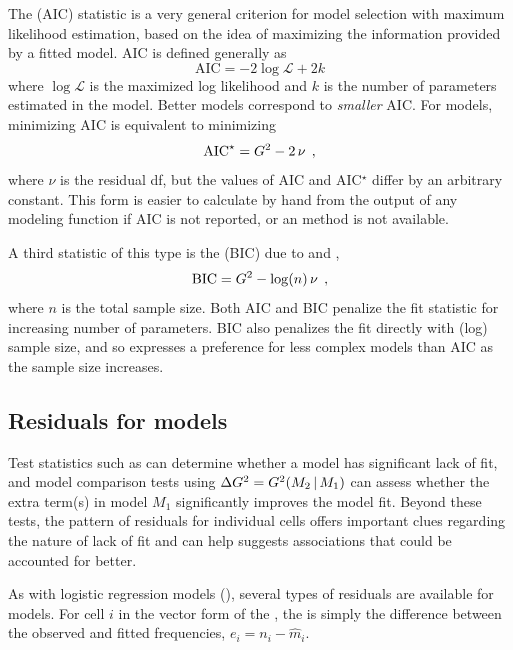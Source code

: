 \documentclass[11pt]{book}\usepackage[]{graphicx}\usepackage[]{color}
\begin{document}
The  (AIC) statistic
\citep{Akaike:73} is a very general criterion for model selection
with maximum likelihood estimation, based on the idea of maximizing
the information provided by a fitted model.  AIC is defined generally
as
\begin{equation*}
\mbox{AIC} = -2 \log \mathcal{L} + 2 k
\end{equation*}
where $\log \mathcal{L}$ is the maximized log likelihood and $k$ is
the number of parameters estimated in the model.
Better models correspond to \emph{smaller} AIC.  For \loglin models,
minimizing AIC is equivalent to minimizing
\begin{equation*}
\mbox{AIC}^{\star} = G^2 - 2 \, \nu \:\: ,
\end{equation*}
where $\nu$ is the residual df,
but the values of AIC and AIC$^\star$ differ by an arbitrary constant.
This form is easier to calculate by hand
from the output of any modeling function if AIC is not reported,
or an  method is not available.

A third statistic of this type is the 
(BIC) due to \citet{Schwartz:78} and \citet{Raftery:1986},
\begin{equation*}
\mbox{BIC} = G^2 - \log (n) \, \nu \:\: ,
\end{equation*}
where $n$ is the total sample size.  Both AIC and BIC penalize the fit
statistic for increasing number of parameters.
BIC also penalizes the fit directly with (log) sample size, and so expresses
a preference for less complex models than AIC as the sample size increases.

\subsection{Residuals for \loglin models}\label{sec:loglin-residuals}

Test statistics such as \GSQ can determine whether a model has significant
lack of fit, and model comparison tests using $\Delta G^2 = G^2 (M_2 \, | \, M_1)$
can assess whether the extra term(s) in model $M_1$ significantly improves the model
fit.  Beyond these tests, the pattern of residuals for individual cells
offers important clues regarding the nature of lack of fit and can help suggests
associations that could be accounted for better.

As with logistic regression models (),
several types of residuals are available for
\loglin models. For cell $i$ in the vector form of the \ctab, the
 is simply the difference between the observed and fitted
frequencies, $e_i = n_i - \widehat{m}_i$.
\end{document}
